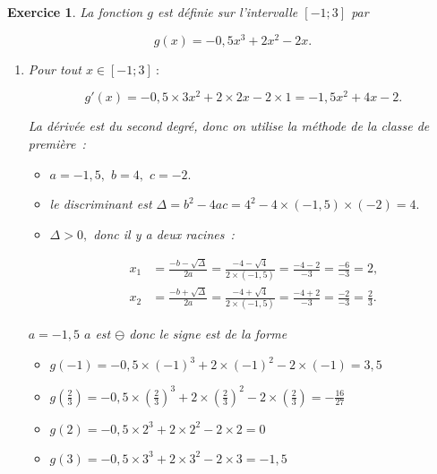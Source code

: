 \documentclass[10pt]{article}
\newtheorem{exo}{Exercice}
\begin{document}
\begin{exo}

La fonction $g$ est définie sur l'intervalle $\left[-1;3\right]$ par

\[ g(x) = -0,5 x^3+2x^2-2x.\]



\begin{enumerate}
\item \medskip

Pour tout $x\in\left[-1;3\right]~:$

\[g'(x)=-0,5\times 3x^2+2\times 2x-2\times 1=-1,5x^2+4x-2.\]

La dérivée est du second degré, donc on utilise la méthode de la classe de première~:

\begin{itemize}
\item[\textbullet] $a=-1,5,$ $b=4,$ $c=-2.$
\item[\textbullet] le discriminant est $\Delta=b^2-4ac=4^2-4\times (-1,5)\times (-2)=4.$
\item[\textbullet] $\Delta>0,$ donc il y a deux racines~:

\begin{align*}x_1&=\frac{-b-\sqrt{\Delta}}{2a}=\frac{-4-\sqrt{4}}{2\times (-1,5)}=\frac{-4-2}{-3}=\frac{-6}{-3}=2,\\
x_2&=\frac{-b+\sqrt{\Delta}}{2a}=\frac{-4+\sqrt{4}}{2\times (-1,5)}=\frac{-4+2}{-3}=\frac{-2}{-3}=\frac{2}{3}.
\end{align*}
\end{itemize}

\medskip

$a=-1,5$  $a$ est $\ominus$ donc le signe est de la forme \fbox{$-~\upphi~+~\upphi~-$}

\medskip

\setlength{\columnseprule}{1pt}

\begin{multicols}{2}
\begin{center}
\end{center}

\columnbreak

\begin{itemize}
\item[\textbullet] $g(-1)=-0,5\times (-1)^3+2\times (-1)^2-2\times (-1)=3,5$
\item[\textbullet] $g\left(\frac{2}{3}\right)=-0,5\times \left(\frac{2}{3}\right)^3+2\times \left(\frac{2}{3}\right)^2-2\times \left(\frac{2}{3}\right)=-\frac{16}{27}$
\item[\textbullet] $g(2)=-0,5\times 2^3+2\times 2^2-2\times 2=0$
\item[\textbullet] $g(3)=-0,5\times 3^3+2\times 3^2-2\times 3=-1,5$


\end{itemize}
\end{multicols}
\end{enumerate}
\end{exo}
\end{document}
